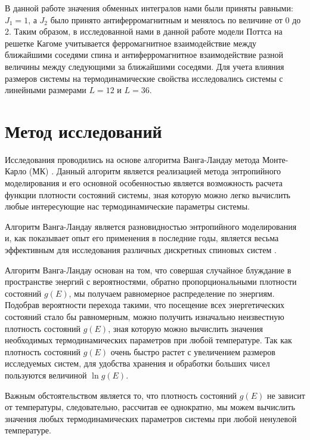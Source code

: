 В данной работе значения обменных интегралов нами были приняты равными: $J_1 = 1$, а $J_2$ было принято антиферромагнитным и менялось по величине от 0 до 2. Таким образом, в исследованной нами в данной работе модели Поттса на решетке Кагоме учитывается ферромагнитное взаимодействие между ближайшими соседями спина и антиферромагнитное взаимодействие разной величины между следующими за ближайшими соседями. Для учета влияния размеров системы на термодинамические свойства исследовались системы с линейными размерами $L=12$ и $L=36$.


\section{Метод исследований}

Исследования проводились на основе алгоритма Ванга-Ландау метода Монте-Карло (МК) \cite{mma-bib-10, mma-bib-11, mma-bib-12, mma-bib-13, mma-bib-14, mma-bib-15}. Данный алгоритм является реализацией метода энтропийного моделирования и его основной особенностью является возможность расчета функции плотности состояний системы, зная которую можно легко вычислить любые интересующие нас термодинамические параметры системы.

Алгоритм Ванга-Ландау является разновидностью энтропийного моделирования и, как показывает опыт его применения в последние годы, является весьма эффективным для исследования различных дискретных спиновых систем \cite{mma-bib-14}.

Алгоритм Ванга-Ландау основан на том, что совершая случайное блуждание в пространстве энергий с вероятностями, обратно пропорциональными плотности состояний $g(E)$, мы получаем равномерное распределение по энергиям. Подобрав вероятности перехода такими, что посещение всех энергетических состояний стало бы равномерным, можно получить изначально неизвестную плотность состояний $g(E)$, зная которую можно вычислить значения необходимых термодинамических параметров при любой температуре. Так как плотность состояний $g(E)$ очень быстро растет с увеличением размеров исследуемых систем, для удобства хранения и обработки больших чисел пользуются величиной $\ln g(E)$.

Важным обстоятельством является то, что плотность состояний $g(E)$ не зависит от температуры, следовательно, рассчитав ее однократно, мы можем вычислить значения любых термодинамических параметров системы при любой ненулевой температуре.

